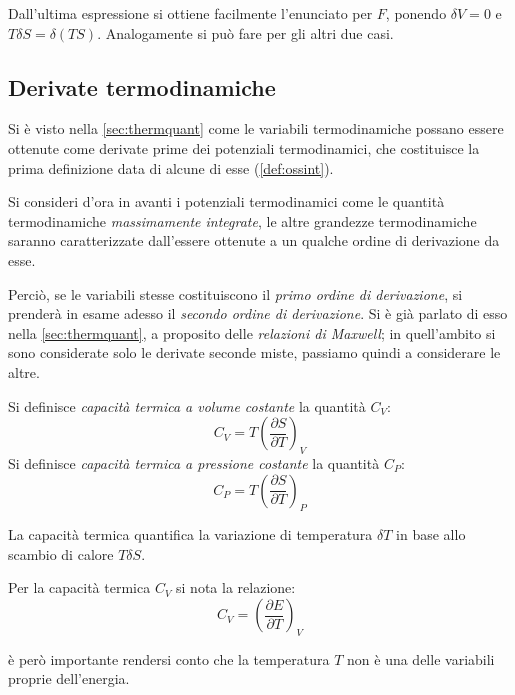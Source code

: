 Dall'ultima espressione si ottiene facilmente l'enunciato per $F$, ponendo $\delta V = 0$ e $T \delta S = \delta (T S)$. Analogamente si può fare per gli altri due casi.

\subsection{Derivate termodinamiche}
\label{sec:thermdev}

Si è visto nella \cref{sec:thermquant} come le variabili termodinamiche possano essere ottenute come derivate prime dei potenziali termodinamici, che costituisce la prima definizione data di alcune di esse (\cref{def:ossint}).

Si consideri d'ora in avanti i potenziali termodinamici come le quantità termodinamiche \textit{massimamente integrate}, le altre grandezze termodinamiche saranno caratterizzate dall'essere ottenute a un qualche ordine di derivazione da esse.

Perciò, se le variabili stesse costituiscono il \textit{primo ordine di derivazione}, si prenderà in esame adesso il \textit{secondo ordine di derivazione}. Si è già parlato di esso nella \cref{sec:thermquant}, a proposito delle \textit{relazioni di Maxwell}; in quell'ambito si sono considerate solo le derivate seconde miste, passiamo quindi a considerare le altre.

\begin{defn}
	Si definisce \textit{capacità termica a volume costante} la quantità $C_V$:
	\begin{equation*}
	C_V = T \left(\frac{\partial S}{\partial T}\right)_V
	\end{equation*}
	Si definisce \textit{capacità termica a pressione costante} la quantità $C_P$:
	\begin{equation*}
	C_P = T \left(\frac{\partial S}{\partial T}\right)_P
	\end{equation*}
\end{defn}

\noindent La capacità termica quantifica la variazione di temperatura $\delta T$ in base allo scambio di calore $T \delta S$.

Per la capacità termica $C_V$ si nota la relazione:
\begin{equation*}
C_V = \left(\frac{\partial E}{\partial T}\right)_V
\end{equation*}

\noindent è però importante rendersi conto che la temperatura $T$ non è una delle variabili proprie dell'energia.


